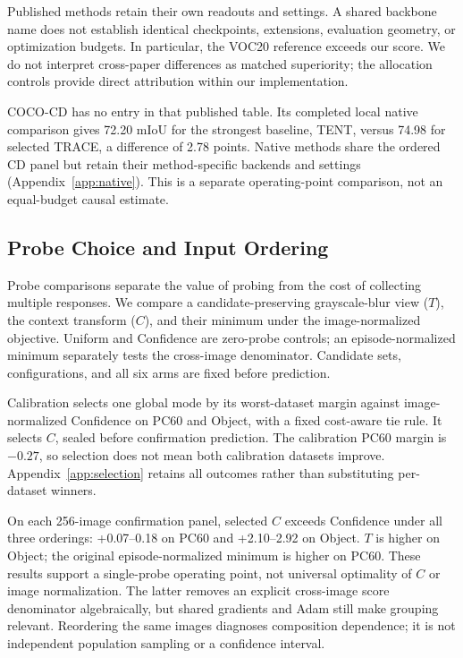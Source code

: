 \documentclass[letterpaper]{article}
\begin{document}


Published methods retain their own readouts and settings. A shared backbone name does not establish identical checkpoints, extensions, evaluation geometry, or optimization budgets. In particular, the VOC20 reference exceeds our score. We do not interpret cross-paper differences as matched superiority; the allocation controls provide direct attribution within our implementation.

COCO-CD has no entry in that published table. Its completed local native comparison gives 72.20 mIoU for the strongest baseline, TENT, versus 74.98 for selected TRACE, a difference of 2.78 points. Native methods share the ordered CD panel but retain their method-specific backends and settings (Appendix~\ref{app:native}). This is a separate operating-point comparison, not an equal-budget causal estimate.

\subsection{Probe Choice and Input Ordering}
Probe comparisons separate the value of probing from the cost of collecting multiple responses. We compare a candidate-preserving grayscale-blur view ($T$), the context transform ($C$), and their minimum under the image-normalized objective. Uniform and Confidence are zero-probe controls; an episode-normalized minimum separately tests the cross-image denominator. Candidate sets, configurations, and all six arms are fixed before prediction.

Calibration selects one global mode by its worst-dataset margin against image-normalized Confidence on PC60 and Object, with a fixed cost-aware tie rule. It selects $C$, sealed before confirmation prediction. The calibration PC60 margin is $-0.27$, so selection does not mean both calibration datasets improve. Appendix~\ref{app:selection} retains all outcomes rather than substituting per-dataset winners.

On each 256-image confirmation panel, selected $C$ exceeds Confidence under all three orderings: +0.07--0.18 on PC60 and +2.10--2.92 on Object. $T$ is higher on Object; the original episode-normalized minimum is higher on PC60. These results support a single-probe operating point, not universal optimality of $C$ or image normalization. The latter removes an explicit cross-image score denominator algebraically, but shared gradients and Adam still make grouping relevant. Reordering the same images diagnoses composition dependence; it is not independent population sampling or a confidence interval.
\end{document}
